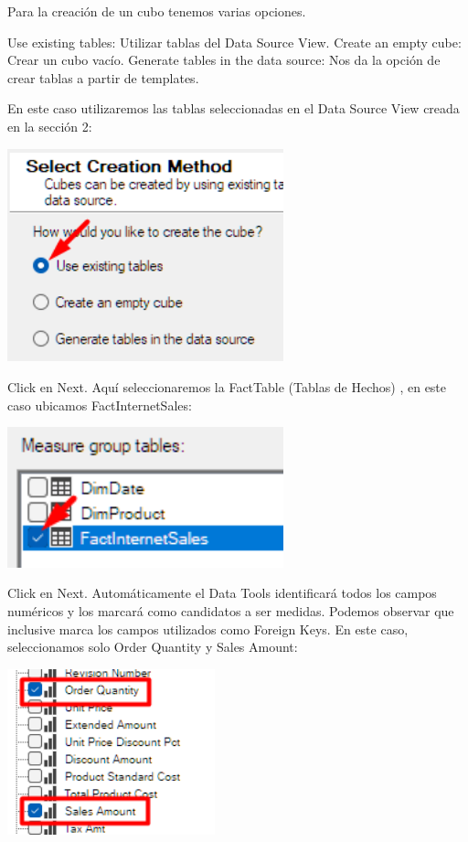 \documentclass[12pt,letterpaper]{article}
\begin{document}
Para la creación de un cubo tenemos varias opciones.


Use existing tables: Utilizar tablas del Data Source View.
Create an empty cube: Crear un cubo vacío.
Generate tables in the data source: Nos da la opción de crear tablas a partir de templates.


En este caso utilizaremos las tablas seleccionadas en el Data Source View creada en la sección 2:

\begin{center}
    \includegraphics[width=8cm]{./img/img13.png}
\end{center}

Click en Next. Aquí seleccionaremos la FactTable (Tablas de Hechos) , en este caso ubicamos FactInternetSales:

\begin{center}
    \includegraphics[width=8cm]{./img/img14.png}
\end{center}

Click en Next. Automáticamente el Data Tools identificará todos los campos numéricos y los marcará como candidatos a ser medidas. Podemos observar que inclusive marca los campos utilizados como Foreign Keys. En este caso, seleccionamos solo Order Quantity y Sales Amount:

\begin{center}
    \includegraphics[width=6cm]{./img/img15.png}
\end{center}
\end{document}
